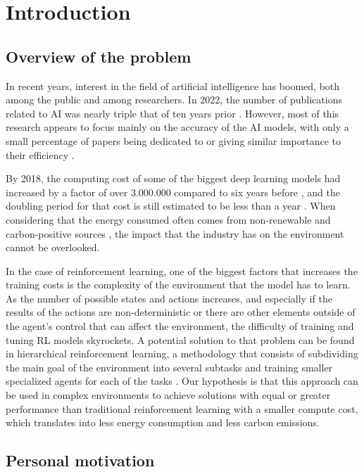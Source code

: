 \chapter{Introduction}
\label{chapter:introduction}

\section{Overview of the problem}

In recent years, interest in the field of artificial intelligence has boomed, both among the public and among researchers. In 2022, the number of publications related to AI was nearly triple that of ten years prior \cite{Nestor:2024}. However, most of this research appears to focus mainly on the accuracy of the AI models, with only a small percentage of papers being dedicated to or giving similar importance to their efficiency \cite{Schwartz:2019}.

By 2018, the computing cost of some of the biggest deep learning models had increased by a factor of over 3.000.000 compared to six years before \cite{Amodei:2018}, and the doubling period for that cost is still estimated to be less than a year \cite{Jaime:2022}. When considering that the energy consumed often comes from non-renewable and carbon-positive sources \cite{Strubell:2019}, the impact that the industry has on the environment cannot be overlooked.

In the case of reinforcement learning, one of the biggest factors that increases the training costs is the complexity of the environment that the model has to learn. As the number of possible states and actions increases, and especially if the results of the actions are non-deterministic or there are other elements outside of the agent's control that can affect the environment, the difficulty of training and tuning RL models skyrockets. A potential solution to that problem can be found in hierarchical reinforcement learning, a methodology that consists of subdividing the main goal of the environment into several subtasks and training smaller specialized agents for each of the tasks \cite{Barto:2003, Al-Emran:2015, Pateria:2021}. Our hypothesis is that this approach can be used in complex environments to achieve solutions with equal or greater performance than traditional reinforcement learning with a smaller compute cost, which translates into less energy consumption and less carbon emissions.

\section{Personal motivation}

